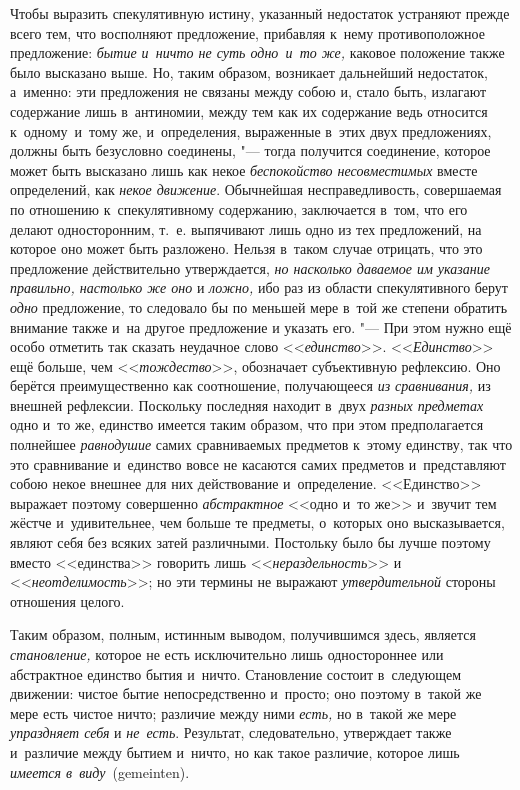 Чтобы выразить спекулятивную истину, указанный недостаток устраняют прежде
всего тем, что восполняют предложение, прибавляя к~нему противоположное
предложение: {\em бытие и~ничто не суть одно~и~то же,} каковое положение также
было высказано выше. Но, таким образом, возникает дальнейший
недостаток, а~именно: эти предложения не связаны между собою и, стало быть,
излагают содержание лишь в~антиномии, между тем как их содержание ведь
относится к~одному~и~тому же, и~определения, выраженные в~этих двух
предложениях, должны быть безусловно соединены, "--- тогда получится
соединение, которое может быть высказано лишь как некое {\em беспокойство
несовместимых} вместе определений, как {\em некое движение}. Обычнейшая
несправедливость, совершаемая по отношению к~спекулятивному содержанию,
заключается в~том, что его делают односторонним, т.~е. выпячивают лишь одно из
тех предложений, на которое оно может быть разложено. Нельзя в~таком случае
отрицать, что это предложение действительно утверждается, {\em но насколько
даваемое им указание правильно, настолько же оно} и {\em ложно,} ибо раз
из области спекулятивного берут {\em одно} предложение, то следовало бы по
меньшей мере в~той же степени обратить внимание также и~на другое предложение и
указать его. "--- При этом нужно ещё особо отметить так сказать неудачное слово
<<{\em единство}>>. <<{\em Единство}>> ещё больше, чем <<{\em тождество}>>,
обозначает субъективную рефлексию. Оно берётся преимущественно как соотношение,
получающееся {\em из сравнивания,} из внешней рефлексии. Поскольку последняя
находит в~двух {\em разных предметах} одно и~то же, единство имеется таким
образом, что при этом предполагается полнейшее {\em равнодушие} самих
сравниваемых предметов к~этому единству, так что это сравнивание и~единство
вовсе не касаются самих предметов и~представляют собою некое внешнее для них
действование и~определение. <<Единство>> выражает поэтому совершенно
{\em абстрактное} <<одно и~то же>> и~звучит тем жёстче и~удивительнее, чем
больше те предметы, о~которых оно высказывается, являют себя без всяких затей
различными. Постольку было бы лучше поэтому вместо <<единства>> говорить лишь
<<{\em нераздельность}>> и <<{\em неотделимость}>>; но эти термины не выражают
{\em утвердительной} стороны отношения целого.

Таким образом, полным, истинным выводом, получившимся здесь, является
{\em становление,} которое не есть исключительно лишь одностороннее или
абстрактное единство бытия и~ничто. Становление состоит в~следующем движении:
чистое бытие непосредственно и~просто; оно поэтому в~такой же мере есть чистое
ничто; различие между ними {\em есть,} но в~такой же мере {\em упраздняет себя}
и {\em не~есть}. Результат, следовательно, утверждает также и~различие между
бытием и~ничто, но как такое различие, которое лишь
{\em имеется в~виду}~(gemeinten).

